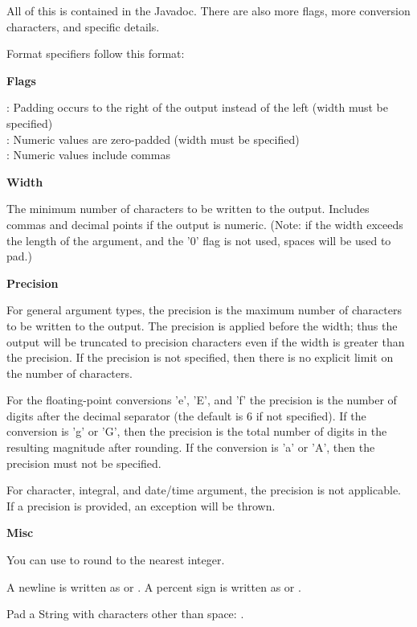 
All of this is contained in the  Javadoc. There are also more flags, more conversion characters, and specific details.

Format specifiers follow this format: \\

\textbf{Flags}

\inline{-} : Padding occurs to the right of the output instead of the left (width must be specified) \\
 : Numeric values are zero-padded (width must be specified) \\
\inline{,} : Numeric values include commas

\textbf{Width}

The minimum number of characters to be written to the output. Includes commas and decimal points if the output is numeric. (Note: if the width exceeds the length of the argument, and the '0' flag is not used, spaces will be used to pad.)

\textbf{Precision}

For general argument types, the precision is the maximum number of characters to be written to the output. The precision is applied before the width; thus the output will be truncated to precision characters even if the width is greater than the precision. If the precision is not specified, then there is no explicit limit on the number of characters.

For the floating-point conversions 'e', 'E', and 'f' the precision is the number of digits after the decimal separator (the default is 6 if not specified). If the conversion is 'g' or 'G', then the precision is the total number of digits in the resulting magnitude after rounding. If the conversion is 'a' or 'A', then the precision must not be specified.

For character, integral, and date/time argument, the precision is not applicable. If a precision is provided, an exception will be thrown.

\textbf{Misc}

You can use  to round to the nearest integer.

A newline is written as  or . A percent sign is written as \inline{\%\%} or \inline{\textbackslash\%}.

Pad a String with characters other than space: .

